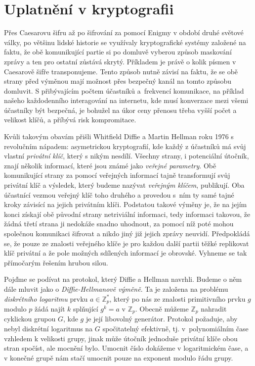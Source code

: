 \documentclass[12pt]{report}
\begin{document}
\chapter{Uplatnění v kryptografii}

Přes Caesarovu šifru až po šifrování za pomocí Enigmy v období druhé světové války, po většinu lidské historie se využívaly kryptografické systémy založené na faktu, že obě komunikující partie si po domluvě vyberou způsob maskování zprávy a ten pro ostatní zůstává skrytý. Příkladem je právě o kolik písmen v Caesarově šifře transponujeme. Tento způsob nutně závisí na faktu, že se obě strany před výměnou mají možnost přes bezpečný kanál na tomto způsobu domluvit. S přibývajícím počtem účastníků a~frekvencí komunikace, na příklad našeho každodenního interagování na internetu, kde musí konverzace mezi všemi účastníky být bezpečná, je bohužel na úkor ceny přenosu třeba vyšší počet a velikost klíčů, a příbývá risk kompromitace.

Kvůli takovým obavám přišli Whitfield Diffie a Martin Hellman \cite{Diffie} roku 1976 s revolučním nápadem: asymetrickou kryptografií, kde každý z účastníků má svůj vlastní \textit{privátní klíč}, který s nikým nesdílí. Všechny strany, i potenciální útočník, znají několik informací, které jsou známé jako \textit{veřejné parametry}. Obě komunikující strany za pomocí veřejných informací tajně transformují svůj privátní klíč a výsledek, který budeme nazývat \textit{veřejným klíčem}, publikují. Oba účastnící vezmou veřejný klíč toho druhého a provedou s~ním ty samé tajné kroky závisící na jejich privátním klíči. Podstatou takové výměny je, že na jejím konci získají obě původní strany netriviální informaci, tedy informaci takovou, že žádná třetí strana ji nedokáže snadno uhodnout, za pomocí níž poté mohou společnou komunikaci šifrovat a nikdo jiný již jejich zprávy neuvidí. Předpokládá se, že pouze ze znalosti veřejného klíče je pro každou další partii těžké replikovat klíč privátní a že pole možných sdílených informací je obrovské. Vyhneme se tak přímočarým řešením hrubou silou.

Pojďme se podívat na protokol, který Diffie a Hellman navrhli. Budeme o něm dále mluvit jako o \textit{Diffie-Hellmanově výměně}. Ta je založena na problému \textit{diskrétního logaritmu} prvku $a \in \mathbb{Z}_p^{*}$, který po nás ze znalosti primitivního prvku $g$ modulo $p$ žádá najít $k$ splňující $g^k = a$ v $\mathbb{Z}_p$. Obecně můžeme $\mathbb{Z}_p$ nahradit cyklickou grupou $G$, kde $g$ je její libovolný generátor. Protokol požaduje, aby nebyl diskrétní logaritmus na $G$ spočitatelný efektivně, tj. v~polynomiálním čase vzhledem k velikosti grupy, jinak může útočník jednoduše privátní klíče obou stran spočíst, ale mocnění bylo. Umocnit číslo dokážeme v logaritmickém čase, a v konečné grupě nám stačí umocnit pouze na exponent modulo řádu grupy.
\end{document}
